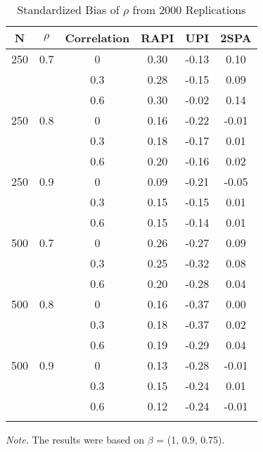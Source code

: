 \documentclass[
  man]{apa7}
\begin{document}
\begin{table}[tbp]

\begin{center}
\begin{threeparttable}

\caption{\label{tab:standardized bias}Standardized Bias of $\rho$ from 2000 Replications}

\begin{tabular}{cccccc}
\toprule
N & \multicolumn{1}{c}{$\rho$} & \multicolumn{1}{c}{Correlation} & \multicolumn{1}{c}{RAPI} & \multicolumn{1}{c}{UPI} & \multicolumn{1}{c}{2SPA}\\
\midrule
250 & 0.7 & 0 & 0.30 & -0.13 & 0.10\\
 &  & 0.3 & 0.28 & -0.15 & 0.09\\
 &  & 0.6 & 0.30 & -0.02 & 0.14\\
250 & 0.8 & 0 & 0.16 & -0.22 & -0.01\\
 &  & 0.3 & 0.18 & -0.17 & 0.01\\
 &  & 0.6 & 0.20 & -0.16 & 0.02\\
250 & 0.9 & 0 & 0.09 & -0.21 & -0.05\\
 &  & 0.3 & 0.15 & -0.15 & 0.01\\
 &  & 0.6 & 0.15 & -0.14 & 0.01\\
500 & 0.7 & 0 & 0.26 & -0.27 & 0.09\\
 &  & 0.3 & 0.25 & -0.32 & 0.08\\
 &  & 0.6 & 0.20 & -0.28 & 0.04\\
500 & 0.8 & 0 & 0.16 & -0.37 & 0.00\\
 &  & 0.3 & 0.18 & -0.37 & 0.02\\
 &  & 0.6 & 0.19 & -0.29 & 0.04\\
500 & 0.9 & 0 & 0.13 & -0.28 & -0.01\\
 &  & 0.3 & 0.15 & -0.24 & 0.01\\
 &  & 0.6 & 0.12 & -0.24 & -0.01\\
\bottomrule
\addlinespace
\end{tabular}

\begin{tablenotes}[para]
\normalsize{\textit{Note.} The results were based on $\beta$ = (1, 0.9, 0.75).}
\end{tablenotes}

\end{threeparttable}
\end{center}

\end{table}
\end{document}

